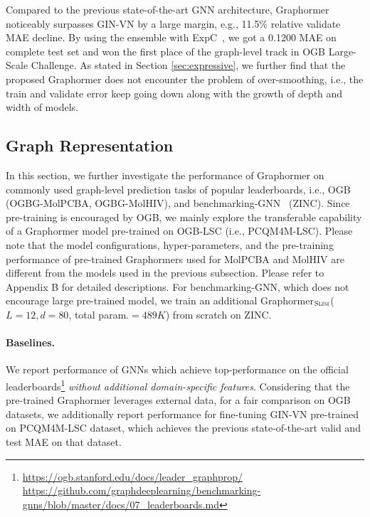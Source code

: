 \documentclass{article}
\begin{document}
Compared to the previous state-of-the-art GNN architecture, Graphormer noticeably surpasses GIN-{\scriptsize VN} by a large margin, e.g., 11.5\% relative validate MAE decline. By using the ensemble with ExpC~\cite{yang2020breaking}, we got a 0.1200 MAE on complete test set and won the first place of the graph-level track in OGB Large-Scale Challenge\cite{hu2021ogb, ying2021first}. As stated in Section \ref{sec:expressive}, we further find that the proposed Graphormer does not encounter the problem of over-smoothing, i.e., the train and validate error keep going down along with the growth of depth and width of models.

\subsection{Graph Representation}

In this section, we further investigate the performance of Graphormer on commonly used graph-level prediction tasks of popular leaderboards, i.e., OGB~\cite{hu2020open} (OGBG-MolPCBA, OGBG-MolHIV), and benchmarking-GNN~\cite{dwivedi2020benchmarking} (ZINC). Since pre-training is encouraged by OGB, we mainly explore the transferable capability of  a Graphormer model pre-trained on OGB-LSC (i.e., PCQM4M-LSC). Please note that the model configurations, hyper-parameters, and the pre-training performance of pre-trained Graphormers used for MolPCBA and MolHIV are different from the models used in the previous subsection. Please refer to Appendix B for detailed descriptions. For benchmarking-GNN, which does not encourage large pre-trained model, we train an additional Graphormer$_{\small \textsc{Slim}}$\xspace ($L=12, d=80$, total param.$=489K$) from scratch on ZINC.

\paragraph{Baselines.} We report performance of GNNs which achieve top-performance on the official leaderboards\footnote{\url{https://ogb.stanford.edu/docs/leader_graphprop/}\\ \url{https://github.com/graphdeeplearning/benchmarking-gnns/blob/master/docs/07_leaderboards.md}} \emph{without additional domain-specific features}. Considering that the pre-trained Graphormer leverages external data, for a fair comparison on OGB datasets, we additionally report performance for fine-tuning GIN-{\scriptsize VN} pre-trained on PCQM4M-LSC dataset, which achieves the previous state-of-the-art valid and test MAE on that dataset. 
\end{document}
